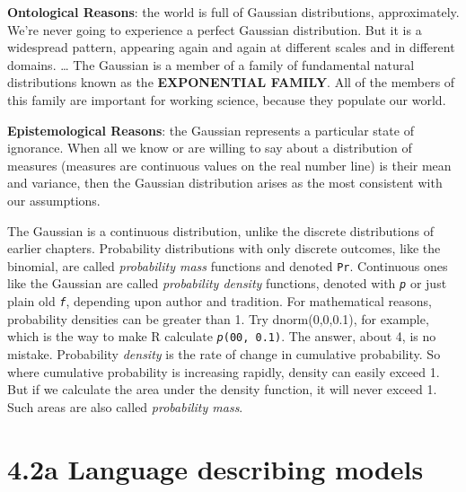 \documentclass[
  letterpaper,
  DIV=11,
  numbers=noendperiod]{scrreprt}
\begin{document}
\textbf{Ontological Reasons}: the world is full of Gaussian
distributions, approximately. We're never going to experience a perfect
Gaussian distribution. But it is a widespread pattern, appearing again
and again at different scales and in different domains. \ldots{} The
Gaussian is a member of a family of fundamental natural distributions
known as the \textbf{EXPONENTIAL FAMILY}. All of the members of this
family are important for working science, because they populate our
world.

\textbf{Epistemological Reasons}: the Gaussian represents a particular
state of ignorance. When all we know or are willing to say about a
distribution of measures (measures are continuous values on the real
number line) is their mean and variance, then the Gaussian distribution
arises as the most consistent with our assumptions.

\begin{tcolorbox}[enhanced jigsaw, colframe=quarto-callout-tip-color-frame, colback=white, toprule=.15mm, breakable, arc=.35mm, bottomtitle=1mm, colbacktitle=quarto-callout-tip-color!10!white, toptitle=1mm, titlerule=0mm, title=\textcolor{quarto-callout-tip-color}{\faLightbulb}\hspace{0.5em}{Gaussian distribution}, leftrule=.75mm, opacityback=0, rightrule=.15mm, opacitybacktitle=0.6, bottomrule=.15mm, left=2mm, coltitle=black]

The Gaussian is a continuous distribution, unlike the discrete
distributions of earlier chapters. Probability distributions with only
discrete outcomes, like the binomial, are called \emph{probability mass}
functions and denoted \texttt{Pr}. Continuous ones like the Gaussian are
called \emph{probability density} functions, denoted with
\emph{\texttt{p}} or just plain old \emph{\texttt{f}}, depending upon
author and tradition. For mathematical reasons, probability densities
can be greater than 1. Try dnorm(0,0,0.1), for example, which is the way
to make R calculate \emph{\texttt{p}}\texttt{(0\textbar{}0,\ 0.1)}. The
answer, about 4, is no mistake. Probability \emph{density} is the rate
of change in cumulative probability. So where cumulative probability is
increasing rapidly, density can easily exceed 1. But if we calculate the
area under the density function, it will never exceed 1. Such areas are
also called \emph{probability mass}.

\end{tcolorbox}

\hypertarget{a-language-describing-models}{%
\section{4.2a Language describing
models}\label{a-language-describing-models}}
\end{document}

